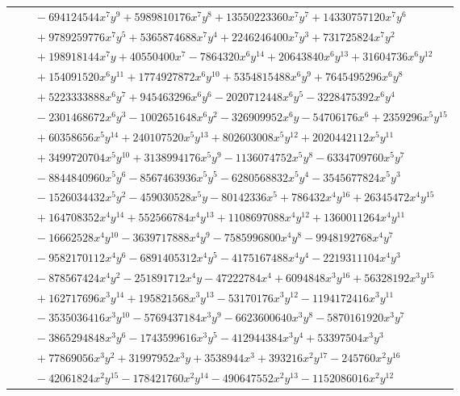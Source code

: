 \documentclass[11pt]{article}
\begin{document}
\begin{longtable}{@{}ll@{}}
 & $\quad -694124544x^{7}y^{9}+5989810176x^{7}y^{8}+13550223360x^{7}y^{7}+14330757120x^{7}y^{6}$\\
 & $\quad +9789259776x^{7}y^{5}+5365874688x^{7}y^{4}+2246246400x^{7}y^{3}+731725824x^{7}y^{2}$\\
 & $\quad +198918144x^{7}y+40550400x^{7}-7864320x^{6}y^{14}+20643840x^{6}y^{13}+31604736x^{6}y^{12}$\\
 & $\quad +154091520x^{6}y^{11}+1774927872x^{6}y^{10}+5354815488x^{6}y^{9}+7645495296x^{6}y^{8}$\\
 & $\quad +5223333888x^{6}y^{7}+945463296x^{6}y^{6}-2020712448x^{6}y^{5}-3228475392x^{6}y^{4}$\\
 & $\quad -2301468672x^{6}y^{3}-1002651648x^{6}y^{2}-326909952x^{6}y-54706176x^{6}+2359296x^{5}y^{15}$\\
 & $\quad +60358656x^{5}y^{14}+240107520x^{5}y^{13}+802603008x^{5}y^{12}+2020442112x^{5}y^{11}$\\
 & $\quad +3499720704x^{5}y^{10}+3138994176x^{5}y^{9}-1136074752x^{5}y^{8}-6334709760x^{5}y^{7}$\\
 & $\quad -8844840960x^{5}y^{6}-8567463936x^{5}y^{5}-6280568832x^{5}y^{4}-3545677824x^{5}y^{3}$\\
 & $\quad -1526034432x^{5}y^{2}-459030528x^{5}y-80142336x^{5}+786432x^{4}y^{16}+26345472x^{4}y^{15}$\\
 & $\quad +164708352x^{4}y^{14}+552566784x^{4}y^{13}+1108697088x^{4}y^{12}+1360011264x^{4}y^{11}$\\
 & $\quad -16662528x^{4}y^{10}-3639717888x^{4}y^{9}-7585996800x^{4}y^{8}-9948192768x^{4}y^{7}$\\
 & $\quad -9582170112x^{4}y^{6}-6891405312x^{4}y^{5}-4175167488x^{4}y^{4}-2219311104x^{4}y^{3}$\\
 & $\quad -878567424x^{4}y^{2}-251891712x^{4}y-47222784x^{4}+6094848x^{3}y^{16}+56328192x^{3}y^{15}$\\
 & $\quad +162717696x^{3}y^{14}+195821568x^{3}y^{13}-53170176x^{3}y^{12}-1194172416x^{3}y^{11}$\\
 & $\quad -3535036416x^{3}y^{10}-5769437184x^{3}y^{9}-6623600640x^{3}y^{8}-5870161920x^{3}y^{7}$\\
 & $\quad -3865294848x^{3}y^{6}-1743599616x^{3}y^{5}-412944384x^{3}y^{4}+53397504x^{3}y^{3}$\\
 & $\quad +77869056x^{3}y^{2}+31997952x^{3}y+3538944x^{3}+393216x^{2}y^{17}-245760x^{2}y^{16}$\\
 & $\quad -42061824x^{2}y^{15}-178421760x^{2}y^{14}-490647552x^{2}y^{13}-1152086016x^{2}y^{12}$\\

\end{longtable}
\end{document}
